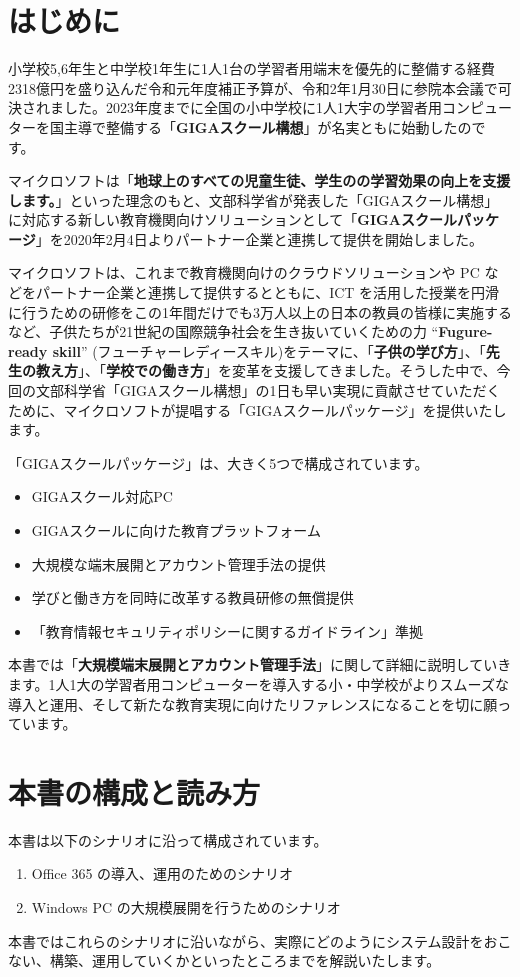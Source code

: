 \section*{はじめに}

小学校5,6年生と中学校1年生に1人1台の学習者用端末を優先的に整備する経費 2318億円を盛り込んだ令和元年度補正予算が、令和2年1月30日に参院本会議で可決されました。2023年度までに全国の小中学校に1人1大宇の学習者用コンピューターを国主導で整備する「\textbf{GIGAスクール構想}」が名実ともに始動したのです。

マイクロソフトは「\textbf{地球上のすべての児童生徒、学生のの学習効果の向上を支援します。}」といった理念のもと、文部科学省が発表した「GIGAスクール構想」に対応する新しい教育機関向けソリューションとして「\textbf{GIGAスクールパッケージ}」を2020年2月4日よりパートナー企業と連携して提供を開始しました。

マイクロソフトは、これまで教育機関向けのクラウドソリューションや PC などをパートナー企業と連携して提供するとともに、ICT を活用した授業を円滑に行うための研修をこの1年間だけでも3万人以上の日本の教員の皆様に実施するなど、子供たちが21世紀の国際競争社会を生き抜いていくための力 ``\textbf{Fugure-ready skill}'' (フューチャーレディースキル)をテーマに、「\textbf{子供の学び方}」、「\textbf{先生の教え方}」、「\textbf{学校での働き方}」を変革を支援してきました。そうした中で、今回の文部科学省「GIGAスクール構想」の1日も早い実現に貢献させていただくために、マイクロソフトが提唱する「GIGAスクールパッケージ」を提供いたします。

「GIGAスクールパッケージ」は、大きく5つで構成されています。

\begin{itemize}
    \item GIGAスクール対応PC
    \item GIGAスクールに向けた教育プラットフォーム
    \item 大規模な端末展開とアカウント管理手法の提供
    \item 学びと働き方を同時に改革する教員研修の無償提供
    \item 「教育情報セキュリティポリシーに関するガイドライン」準拠
\end{itemize}

本書では「\textbf{大規模端末展開とアカウント管理手法}」に関して詳細に説明していきます。1人1大の学習者用コンピューターを導入する小・中学校がよりスムーズな導入と運用、そして新たな教育実現に向けたリファレンスになることを切に願っています。

\section*{本書の構成と読み方}

本書は以下のシナリオに沿って構成されています。

\begin{enumerate}
    \item Office 365 の導入、運用のためのシナリオ
    \item Windows PC の大規模展開を行うためのシナリオ
\end{enumerate}

本書ではこれらのシナリオに沿いながら、実際にどのようにシステム設計をおこない、構築、運用していくかといったところまでを解説いたします。
